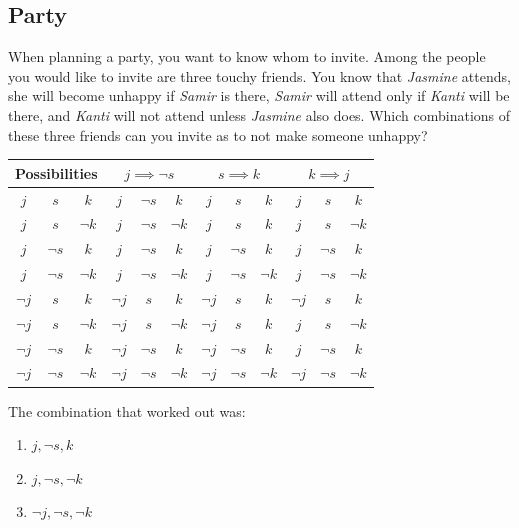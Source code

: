 \documentclass{article}
\begin{document}
\subsection{Party}
When planning a party, you want to know whom to invite. Among the people you would like to invite are three touchy friends. You know that \textit{Jasmine} attends, she will become unhappy if \textit{Samir} is there, \textit{Samir} will attend only if \textit{Kanti} will be there, and \textit{Kanti} will not attend unless \textit{Jasmine} also does. Which combinations of these three friends can you invite as to not make someone unhappy? \\
\begin{center}
\begin{tabular}{|c|c|c|c|c|c|c|c|c|c|c|c|}
	\hline
	\multicolumn{3}{|c|}{  Possibilities  } & \multicolumn{3}{|c|}{  $ j \implies \neg s $  } & \multicolumn{3}{|c|}{  $ s \implies k $  } & \multicolumn{3}{|c|}{$ k \implies j $} \\
	\hline
	\hline
	$ j $ & $ s $ & $ k $ & $ j $ & $ \neg s $ & $ k $ & $ j $ & $ s $ & $ k $ & $ j $ & $ s $ & $ k $  \\ 
	$ j $ & $ s $ & $ \neg k $ & $ j $ & $ \neg s $ & $ \neg k $ & $ j $ & $ s $ & $ k $ & $ j $ & $ s $ & $ \neg k $  \\ 
	$ j $ & $ \neg s $ & $ k $ & $ j $ & $ \neg s $ & $ k $ & $ j $ & $ \neg s $ & $ k $ & $ j $ & $ \neg s $ & $ k $  \\ 
	$ j $ & $ \neg s $ & $ \neg k $ & $ j $ & $ \neg s $ & $ \neg k $ & $ j $ & $ \neg s $ & $ \neg k $ & $ j $ & $ \neg s $ & $ \neg k $  \\ 
	$ \neg j $ & $ s $ & $ k $ & $ \neg j $ & $ s $ & $ k $ & $ \neg j $ & $ s $ & $ k $ & $ \neg j $ & $ s $ & $ k $  \\ 
	$ \neg j $ & $ s $ & $ \neg k $ & $ \neg j $ & $ s $ & $ \neg k $ & $ \neg j $ & $ s $ & $ k $ & $ j $ & $ s $ & $ \neg k $  \\ 
	$ \neg j $ & $ \neg s $ & $ k $ & $ \neg j $ & $ \neg s $ & $ k $ & $ \neg j $ & $ \neg s $ & $ k $ & $ j $ & $ \neg s $ & $ k $  \\ 
	$ \neg j $ & $ \neg s $ & $ \neg k $ & $ \neg j $ & $ \neg s $ & $ \neg k $ & $ \neg j $ & $ \neg s $ & $ \neg k $ & $ \neg j $ & $ \neg s $ & $ \neg k $  \\ 
	\hline
\end{tabular}
\end{center}


The combination that worked out was:
\begin{enumerate}
	\item $ j, \neg s, k$
	\item $ j, \neg s, \neg k$
	\item $ \neg j, \neg s, \neg k$
\end{enumerate}
\end{document}
